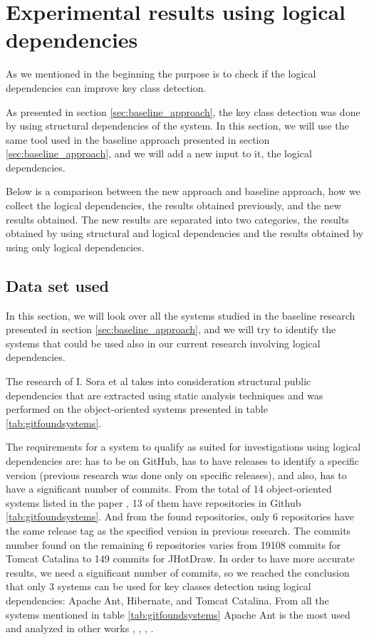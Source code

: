 \documentclass[runningheads]{comsis2}
\begin{document}
\section{Experimental results using logical dependencies}
\label{sec:current_measurements}

As we mentioned in the beginning the purpose is to check if the logical dependencies can improve key class detection. 

As presented in section \ref{sec:baseline_approach}, the key class detection was done by using structural dependencies of the system. 
In this section, we will use the same tool used in the baseline approach presented in section \ref{sec:baseline_approach}, and we will add a new input to it, the logical dependencies. 

Below is a comparison between the new approach and baseline approach, how we collect the logical dependencies, the results obtained previously, and the new results obtained. 
The new results are separated into two categories, the results obtained by using structural and logical dependencies and the results obtained by using only logical dependencies. 

\subsection{Data set used}
\label{sec:dataset}
In this section, we will look over all the systems studied in the baseline research presented in section \ref{sec:baseline_approach}, and we will try to identify the systems that could be used also in our current research involving logical dependencies.


The research of I. Sora et al \cite{Finding-key-classes} takes into consideration structural public dependencies that are extracted using static analysis techniques and was performed on the object-oriented systems presented in table \ref{tab:gitfoundsystems}.

The requirements for a system to qualify as suited for investigations using logical dependencies are: has to be on GitHub, has to have releases to identify a specific version (previous research was done only on specific releases), and also, has to have a significant number of commits. 
From the total of 14 object-oriented systems listed in the paper \cite{Finding-key-classes}, 13 of them have repositories in Github \ref{tab:gitfoundsystems}. And from the found repositories, only 6 repositories have the same release tag as the specified version in previous research.
The commits number found on the remaining 6 repositories varies from 19108 commits for Tomcat Catalina to 149 commits for JHotDraw. In order to have more accurate results, we need a significant number of commits, so we reached the conclusion that only 3 systems can be used for key classes detection using logical dependencies: Apache Ant, Hibernate, and Tomcat Catalina.  From all the systems mentioned in table \ref{tab:gitfoundsystems} Apache Ant is the most used and analyzed in other  works \cite{enase19}, \cite{7332515}, \cite{1402122}, \cite{Kamran2016IdentificationOC}.
\end{document}

